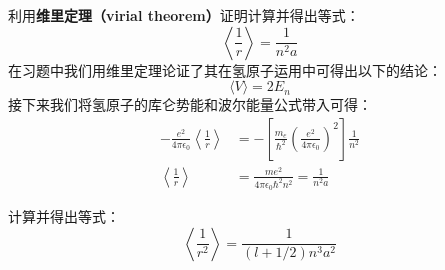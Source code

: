 \begin{exercise}{}\label{exe_HfineS_1}
利用\textbf{维里定理（virial theorem）}证明计算并得出等式：
\begin{equation}
\left\langle\frac{1}{r}\right\rangle = \frac{1}{n^2a}
\end{equation}
在习题中我们用维里定理论证了其在氢原子运用中可得出以下的结论：
\begin{equation}
\langle V\rangle =2E_n
\end{equation}
接下来我们将氢原子的库仑势能和波尔能量公式带入可得：
\begin{align}
-\frac{e^2}{4\pi\epsilon_0}\left\langle \frac{1}{r}\right\rangle&=-\left[\frac {m_e}{\hbar^{2}} \left(\frac {e^ {2}}{4\pi \epsilon_0}\right)^ {2}\right]  \frac {1}{n^ {2}}\\
\left\langle \frac{1}{r}\right\rangle&=\frac{me^2}{4\pi\epsilon_0\hbar^2n^2}=\frac{1}{n^2a}
\end{align}


\end{exercise}
\begin{exercise}{}\label{exe_HfineS_2}
计算并得出等式：
\begin{equation}
\left\langle \frac{1}{r^2}\right\rangle = \frac{1}{(l+1/2)n^3a^2}
\end{equation}
\end{exercise}

